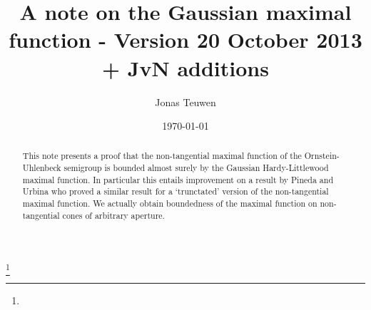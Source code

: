 \documentclass{amsart}
\theoremstyle{remark}
\begin{document}
\title[Gaussian maximal functions]{A note on the Gaussian maximal
  function - Version 20 October 2013 + JvN additions}



\author{Jonas Teuwen}%
\address{Delft Institute of Applied Mathematics,
  Delft University of Technology, P.O. Box 5031, 2600 GA Delft, The
  Netherlands}%
%
%
\thanks{}%
\date{\today}

\maketitle

\begin{abstract}
  This note presents a proof that the non-tangential maximal function of the
  Ornstein-Uhlenbeck semigroup is bounded almost surely by the Gaussian
  Hardy-Littlewood maximal function.  In particular this entails improvement on
  a result by Pineda and Urbina \cite{Pineda2008} who proved a similar result
  for a `trunctated' version of the non-tangential maximal function. We
  actually obtain boundedness of the maximal function on non-tangential cones
  of arbitrary aperture.
\end{abstract}


\maketitle
\end{document}
